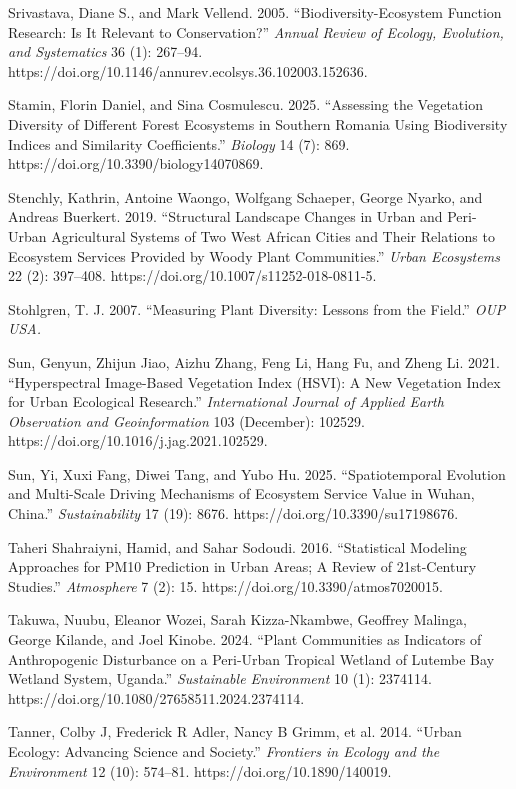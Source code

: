 Srivastava, Diane S., and Mark Vellend. 2005. ``Biodiversity-Ecosystem Function Research: Is It Relevant to Conservation?'' \emph{Annual Review of Ecology, Evolution, and Systematics} 36 (1): 267--94. https://doi.org/10.1146/annurev.ecolsys.36.102003.152636.

Stamin, Florin Daniel, and Sina Cosmulescu. 2025. ``Assessing the Vegetation Diversity of Different Forest Ecosystems in Southern Romania Using Biodiversity Indices and Similarity Coefficients.'' \emph{Biology} 14 (7): 869. https://doi.org/10.3390/biology14070869.

Stenchly, Kathrin, Antoine Waongo, Wolfgang Schaeper, George Nyarko, and Andreas Buerkert. 2019. ``Structural Landscape Changes in Urban and Peri-Urban Agricultural Systems of Two West African Cities and Their Relations to Ecosystem Services Provided by Woody Plant Communities.'' \emph{Urban Ecosystems} 22 (2): 397--408. https://doi.org/10.1007/s11252-018-0811-5.

Stohlgren, T. J. 2007. ``Measuring Plant Diversity: Lessons from the Field.'' \emph{OUP USA.}

Sun, Genyun, Zhijun Jiao, Aizhu Zhang, Feng Li, Hang Fu, and Zheng Li. 2021. ``Hyperspectral Image-Based Vegetation Index (HSVI): A New Vegetation Index for Urban Ecological Research.'' \emph{International Journal of Applied Earth Observation and Geoinformation} 103 (December): 102529. https://doi.org/10.1016/j.jag.2021.102529.

Sun, Yi, Xuxi Fang, Diwei Tang, and Yubo Hu. 2025. ``Spatiotemporal Evolution and Multi-Scale Driving Mechanisms of Ecosystem Service Value in Wuhan, China.'' \emph{Sustainability} 17 (19): 8676. https://doi.org/10.3390/su17198676.

Taheri Shahraiyni, Hamid, and Sahar Sodoudi. 2016. ``Statistical Modeling Approaches for PM10 Prediction in Urban Areas; A Review of 21st-Century Studies.'' \emph{Atmosphere} 7 (2): 15. https://doi.org/10.3390/atmos7020015.

Takuwa, Nuubu, Eleanor Wozei, Sarah Kizza-Nkambwe, Geoffrey Malinga, George Kilande, and Joel Kinobe. 2024. ``Plant Communities as Indicators of Anthropogenic Disturbance on a Peri-Urban Tropical Wetland of Lutembe Bay Wetland System, Uganda.'' \emph{Sustainable Environment} 10 (1): 2374114. https://doi.org/10.1080/27658511.2024.2374114.

Tanner, Colby J, Frederick R Adler, Nancy B Grimm, et al. 2014. ``Urban Ecology: Advancing Science and Society.'' \emph{Frontiers in Ecology and the Environment} 12 (10): 574--81. https://doi.org/10.1890/140019.

